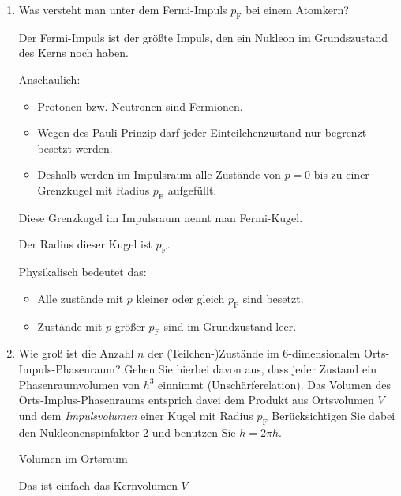 \documentclass[11pt,a4paper]{scrartcl}
\begin{document}
        \begin{enumerate}
            \item 
                Was versteht man unter dem Fermi-Impuls $p_\text{F}$ bei einem Atomkern?

                \begin{calculationbox}
                    Der Fermi-Impuls ist der größte Impuls, den ein Nukleon im Grundszustand des Kerns noch haben.

                    Anschaulich:
                    \begin{itemize}
                        \item Protonen bzw. Neutronen sind Fermionen.
                        \item Wegen des Pauli-Prinzip darf jeder Einteilchenzustand nur begrenzt besetzt werden.
                        \item Deshalb werden im Impulsraum alle Zustände von $p = 0$ bis zu einer Grenzkugel mit Radius $p_\text{F}$ aufgefüllt.
                    \end{itemize}

                    Diese Grenzkugel im Impulsraum nennt man Fermi-Kugel. 

                    Der Radius dieser Kugel ist $p_\text{F}$.

                    Physikalisch bedeutet das:
                    \begin{itemize}
                        \item Alle zustände mit $p$ kleiner oder gleich $p_\text{F}$ sind besetzt.
                        \item Zustände mit $p$ größer $p_\text{F}$ sind im Grundzustand leer. 
                    \end{itemize}
                \end{calculationbox}

            \item
                Wie groß ist die Anzahl $n$ der (Teilchen-)Zustände im 6-dimensionalen Orts-Impuls-Phasenraum? Gehen Sie hierbei davon aus, dass jeder Zustand ein Phasenraumvolumen von $h^3$ einnimmt (Unschärferelation). Das Volumen des Orts-Implus-Phasenraums entsprich davei dem Produkt aus Ortsvolumen $V$ und dem \textit{Impulsvolumen} einer Kugel mit Radius $p_\text{F}$ Berücksichtigen Sie dabei den Nukleonenspinfaktor 2 und benutzen Sie $h = 2 \pi \hbar$.

                \begin{calculationbox}
                    Volumen im Ortsraum
                    \begin{calculationbox}
                        Das ist einfach das Kernvolumen $V$
                    \end{calculationbox}


\end{calculationbox}
\end{enumerate}
\end{document}
